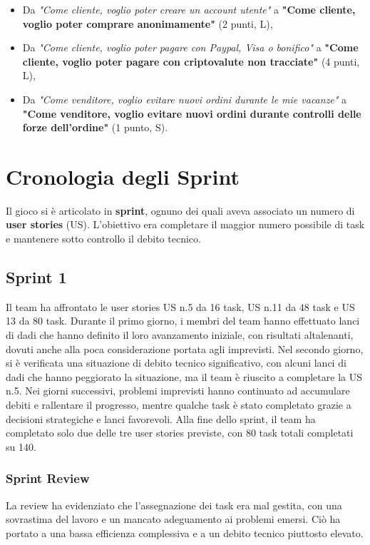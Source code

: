 \documentclass{article}
\begin{document}
\begin{itemize}
    \item Da \textit{"Come cliente, voglio poter creare un account utente"} a \textbf{"Come cliente, voglio poter comprare anonimamente"} (2 punti, L),
    \item Da \textit{"Come cliente, voglio poter pagare con Paypal, Visa o bonifico"} a \textbf{"Come cliente, voglio poter pagare con criptovalute non tracciate"} (4 punti, L),
    \item Da \textit{"Come venditore, voglio evitare nuovi ordini durante le mie vacanze"} a \textbf{"Come venditore, voglio evitare nuovi ordini durante controlli delle forze dell'ordine"} (1 punto, S).
\end{itemize}

\section*{Cronologia degli Sprint}

Il gioco si è articolato in \textbf{sprint}, ognuno dei quali aveva associato un numero di \textbf{user stories} (US). L'obiettivo era completare il maggior numero possibile di task e mantenere sotto controllo il debito tecnico.

\subsection*{Sprint 1}
Il team ha affrontato le user stories US n.5 da 16 task, US n.11 da 48 task e US 13 da 80 task. Durante il primo giorno, i membri del team hanno effettuato lanci di dadi che hanno definito il loro avanzamento iniziale, con risultati altalenanti, dovuti anche alla poca considerazione portata agli imprevisti. Nel secondo giorno, si è verificata una situazione di debito tecnico significativo, con alcuni lanci di dadi che hanno peggiorato la situazione, ma il team è riuscito a completare la US n.5. Nei giorni successivi, problemi imprevisti hanno continuato ad accumulare debiti e rallentare il progresso, mentre qualche task è stato completato grazie a decisioni strategiche e lanci favorevoli. Alla fine dello sprint, il team ha completato solo due delle tre user stories previste, con 80 task totali completati su 140. 

\subsubsection*{Sprint Review}  
La review ha evidenziato che l'assegnazione dei task era mal gestita, con una sovrastima del lavoro e un mancato adeguamento ai problemi emersi. Ciò ha portato a una bassa efficienza complessiva e a un debito tecnico piuttosto elevato.
\end{document}
